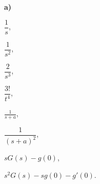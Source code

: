 {\begin{abc}
%
%
\end{abc}
}



{
\textbf{a)}\begin{multicols}{3}
\begin{iii}
\item $\dfrac{1}{s}$,
\item $\dfrac{1}{s^2}$,
\item $\dfrac{2}{s^3}$,
\item $\dfrac{3!}{t^4}$,
\item $\frac{1}{s+a}$,
\item $\dfrac{1}{(s+a)^2}$,
\item $ sG(s) - g(0)$,
\item $ s^2G(s) - sg(0) - g'(0)$.
\end{iii}
\end{multicols}
}
